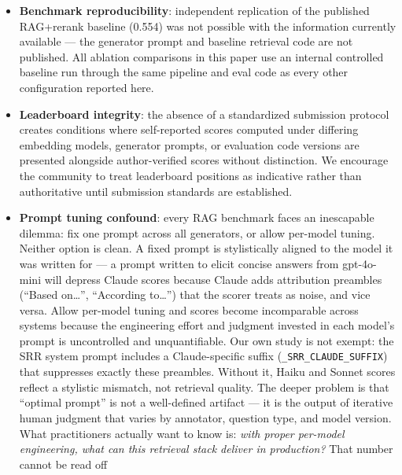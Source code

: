 \documentclass[
]{article}
\begin{document}
\begin{itemize}
  agentic planners operating over this retrieval stack suggests the
  low-to-mid 70s is a sufficient operating point --- a planner with a
  retry-and-reformulation strategy can achieve high compound task
  accuracy without requiring retrieval to be perfect on the first pass
  --- but that claim has not been measured here.
\item
  \textbf{Benchmark reproducibility}: independent replication of the
  published RAG+rerank baseline (0.554) was not possible with the
  information currently available --- the generator prompt and baseline
  retrieval code are not published. All ablation comparisons in this
  paper use an internal controlled baseline run through the same
  pipeline and eval code as every other configuration reported here.
\item
  \textbf{Leaderboard integrity}: the absence of a standardized
  submission protocol creates conditions where self-reported scores
  computed under differing embedding models, generator prompts, or
  evaluation code versions are presented alongside author-verified
  scores without distinction. We encourage the community to treat
  leaderboard positions as indicative rather than authoritative until
  submission standards are established.
\item
  \textbf{Prompt tuning confound}: every RAG benchmark faces an
  inescapable dilemma: fix one prompt across all generators, or allow
  per-model tuning. Neither option is clean. A fixed prompt is
  stylistically aligned to the model it was written for --- a prompt
  written to elicit concise answers from gpt-4o-mini will depress Claude
  scores because Claude adds attribution preambles (``Based
  on\ldots{}'', ``According to\ldots{}'') that the scorer treats as
  noise, and vice versa. Allow per-model tuning and scores become
  incomparable across systems because the engineering effort and
  judgment invested in each model's prompt is uncontrolled and
  unquantifiable. Our own study is not exempt: the SRR system prompt
  includes a Claude-specific suffix (\texttt{\_SRR\_CLAUDE\_SUFFIX})
  that suppresses exactly these preambles. Without it, Haiku and Sonnet
  scores reflect a stylistic mismatch, not retrieval quality. The deeper
  problem is that ``optimal prompt'' is not a well-defined artifact ---
  it is the output of iterative human judgment that varies by annotator,
  question type, and model version. What practitioners actually want to
  know is: \emph{with proper per-model engineering, what can this
  retrieval stack deliver in production?} That number cannot be read off

\end{itemize}
\end{document}
